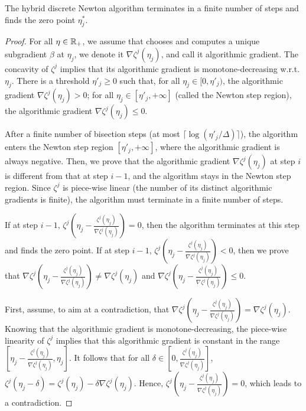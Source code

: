 \begin{proposition}
\label{prop.converg}
The hybrid discrete Newton algorithm terminates in a finite number of steps and finds the zero point $\eta^\ast_j$.
\end{proposition}
\begin{proof}
For all $\eta \in \mathbb R_+$, we assume that   chooses and computes a unique subgradient $\beta$ at $\eta_j$,  we denote it  $\nabla \zeta^j(\eta_j)$, and call it algorithmic gradient.
The concavity of $\zeta^j$ implies that its algorithmic gradient is monotone-decreasing w.r.t. $\eta_j$. There is a threshold $\eta'_j \ge 0$ such that, for all $\eta_j \in [0, \eta'_j)$, the algorithmic gradient $\nabla\zeta^j(\eta_j) > 0$; for all $\eta_j \in  [\eta'_j, +\infty]$ (called the Newton step region), the algorithmic gradient $\nabla\zeta^j(\eta_j) \le  0$.

After a finite number of bisection steps (at most $\lceil \log(\eta'_j / \Delta)\rceil$), the algorithm enters the Newton step region $[\eta'_j, +\infty]$, where the algorithmic gradient is always negative.
Then, we prove that the algorithmic gradient $\nabla\zeta^j(\eta_j)$ at step $i$ is different from that at step $i-1$, and the algorithm stays in the  Newton step region. Since $\zeta^j$ is piece-wise linear (the number of its distinct algorithmic gradients is finite),  the algorithm must terminate in a finite number of steps.

If at step $i-1$, $\zeta^j(\eta_j -  \frac{\zeta^j(\eta_j)}{\nabla\zeta^j(\eta_j)}) = 0 $, then the algorithm terminates at this step and finds the zero point. If at step $i-1$, $\zeta^j(\eta_j - \frac{\zeta^j(\eta_j)}{\nabla\zeta^j(\eta_j)}) < 0 $, then we prove that $\nabla \zeta^j(\eta_j - \frac{\zeta^j(\eta_j)}{\nabla\zeta^j(\eta_j)}) \ne \nabla \zeta^j(\eta_j)$ and $\nabla \zeta^j(\eta_j - \frac{\zeta^j(\eta_j)}{\nabla\zeta^j(\eta_j)}) \le 0$.

First, assume, to aim at a contradiction, that $\nabla \zeta^j(\eta_j - \frac{\zeta^j(\eta_j)}{\nabla\zeta^j(\eta_j)}) = \nabla \zeta^j(\eta_j)$.  Knowing that the algorithmic gradient is  monotone-decreasing, the piece-wise linearity of  $\zeta^j$ implies that this algorithmic gradient is constant in the range $[\eta_j -  \frac{\zeta^j(\eta_j)}{\nabla\zeta^j(\eta_j)}, \eta_j]$. It follows that for all $\delta \in [0, \frac{\zeta^j(\eta_j)}{\nabla\zeta^j(\eta_j)}]$, $\zeta^j(\eta_j - \delta) = \zeta^j(\eta_j) - \delta   \nabla\zeta^j(\eta_j)$. Hence, $\zeta^j(\eta_j - \frac{\zeta^j(\eta_j)}{\nabla\zeta^j(\eta_j)}) = 0$, which leads to a contradiction.


\end{proof}
